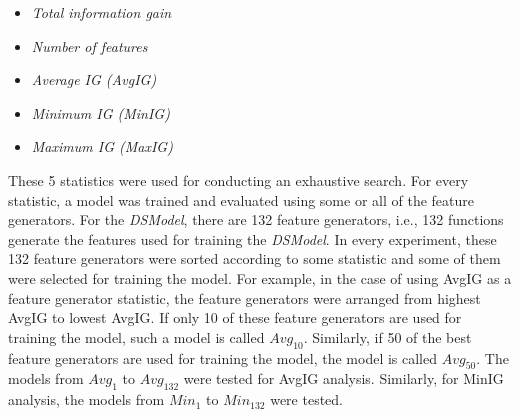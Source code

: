 \begin{itemize}

\item \textit{Total information gain}

\item \textit{Number of features}

\item \textit{Average IG (AvgIG)}

\item \textit{Minimum IG (MinIG)}

\item \textit{Maximum IG (MaxIG)}

\end{itemize}


These 5 statistics were used for conducting an exhaustive search. For every statistic, a model was trained and evaluated using some or all of the feature generators. For the \textit{DSModel}, there are 132 feature generators, i.e., 132 functions generate the features used for training the \textit{DSModel}. In every experiment, these 132 feature generators were sorted according to some statistic and some of them were selected for training the model. For example, in the case of using AvgIG as a feature generator statistic, the feature generators were arranged from highest AvgIG to lowest AvgIG. If only 10 of these feature generators are used for training the model, such a model is called $Avg_{10}$. Similarly, if 50 of the best feature generators are used for training the model, the model is called $Avg_{50}$. The models from $Avg_1$ to $Avg_{132}$ were tested for AvgIG analysis. Similarly, for MinIG analysis, the models from $Min_{1}$ to $Min_{132}$ were tested.

